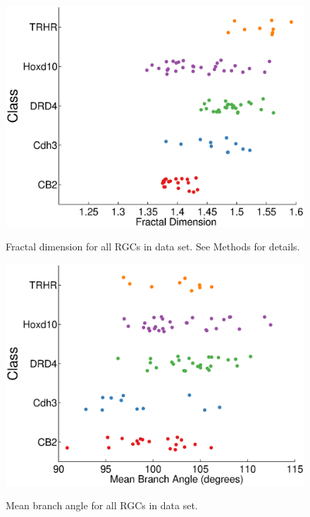 \documentclass{article}
\begin{document}
\begin{figure}
  \centering
  {\includegraphics[scale=0.75]{Figures/SupFig3/plotFeatures-fractalDimensionBoxCounting.eps}}
  \caption{Fractal dimension for all RGCs in data set. See Methods for
  details.}
\end{figure}


\begin{figure}
  \centering
  {\includegraphics[scale=0.75]{Figures/SupFig3/plotFeatures-meanBranchAngle.eps}}
  \caption{Mean branch angle for all RGCs in data set.}
\end{figure}

\clearpage
\end{document}
